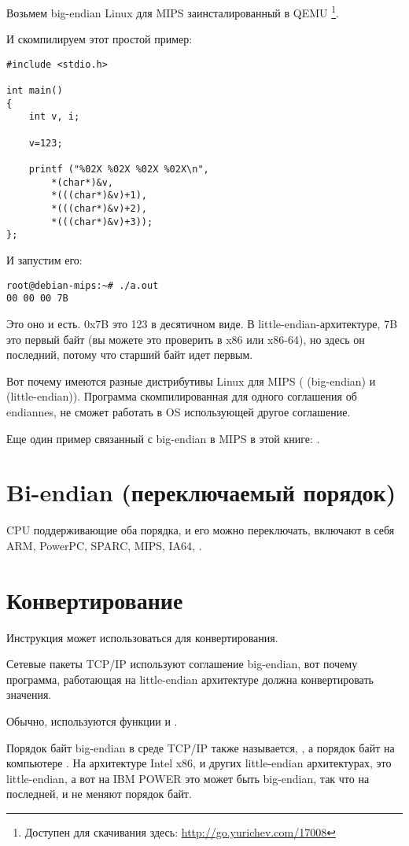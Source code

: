 Возьмем big-endian Linux для MIPS заинсталированный в QEMU
\footnote{Доступен для скачивания здесь: \url{http://go.yurichev.com/17008}}.

И скомпилируем этот простой пример:

\begin{lstlisting}
#include <stdio.h>

int main()
{
	int v, i;

	v=123;

	printf ("%02X %02X %02X %02X\n", 
		*(char*)&v,
		*(((char*)&v)+1),
		*(((char*)&v)+2),
		*(((char*)&v)+3));
};
\end{lstlisting}

И запустим его:

\begin{lstlisting}
root@debian-mips:~# ./a.out 
00 00 00 7B
\end{lstlisting}

Это оно и есть.
0x7B это 123 в десятичном виде.
В little-endian-архитектуре, 7B это первый байт (вы можете это проверить в x86 или x86-64),
но здесь он последний, потому что старший байт идет первым.

Вот почему имеются разные дистрибутивы Linux для MIPS
( (big-endian) и  (little-endian)).
Программа скомпилированная для одного соглашения об endiannes, не сможет работать в OS использующей
другое соглашение.

Еще один пример связанный с big-endian в MIPS в этой книге: .

\section{Bi-endian (переключаемый порядок)}

CPU поддерживающие оба порядка, и его можно переключать, включают в себя ARM, PowerPC, SPARC, MIPS, \ac{IA64}, \etc{}.

\section{Конвертирование}

Инструкция  может использоваться для конвертирования.

Сетевые пакеты TCP/IP используют соглашение big-endian, вот почему программа, работающая на little-endian архитектуре
должна конвертировать значения.

Обычно, используются функции  и .

Порядок байт big-endian в среде TCP/IP также называется, ,
а порядок байт на компьютере .
На архитектуре Intel x86, и других little-endian архитектурах,  это little-endian, 
а вот на IBM POWER это может быть big-endian, так что на последней, 
 и  не меняют порядок байт.

